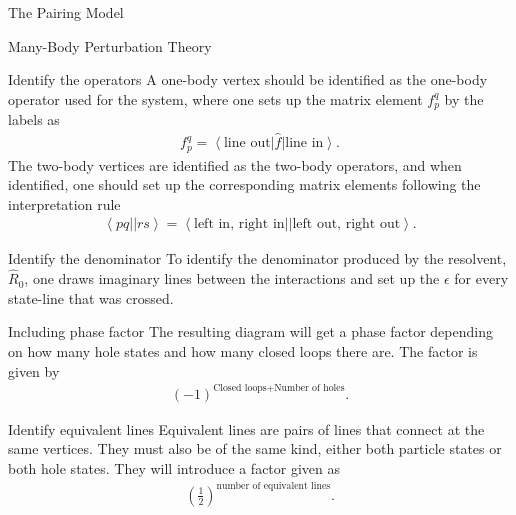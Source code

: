 \documentclass[twoside,english]{uiofysmaster}
\begin{document}
\begin{chapter}{The Pairing Model}
\begin{section}{Many-Body Perturbation Theory}
		\begin{subsection}{Identify the operators}
			A one-body vertex should be identified as the one-body operator used for the system, where one sets up the matrix element $f_p^q$ by the labels as
			\begin{align}
				f_p^q = \left< \text{line out} \right| \hat f \left| \text{line in} \right>.
			\end{align}
			The two-body vertices are identified as the two-body operators, and when identified, one should set up the corresponding matrix elements following the interpretation rule
			\begin{align}
				\left< pq || rs \right> = \left< \text{left in, right in} || \text{left out, right out} \right> .
			\end{align}
		\end{subsection}

		\begin{subsection}{Identify the denominator}
			To identify the denominator produced by the resolvent, $\hat R_0$, one draws imaginary lines between the interactions and set up the $\epsilon$ for every state-line that was crossed.
		\end{subsection}

		\begin{subsection}{Including phase factor}
			The resulting diagram will get a phase factor depending on how many hole states and how many closed loops there are. The factor is given by 
			\begin{align}
				(-1)^{\text{Closed loops} + \text{Number of holes}}.
			\end{align}
		\end{subsection}

		\begin{subsection}{Identify equivalent lines}
			Equivalent lines are pairs of lines that connect at the same vertices. They must also be of the same kind, either both particle states or both hole states. They will introduce a factor given as 
			\begin{align}
				\left( \frac{1}{2} \right)^{\text{number of equivalent lines}}.
			\end{align}
		\end{subsection}


\end{section}
\end{chapter}
\end{document}
